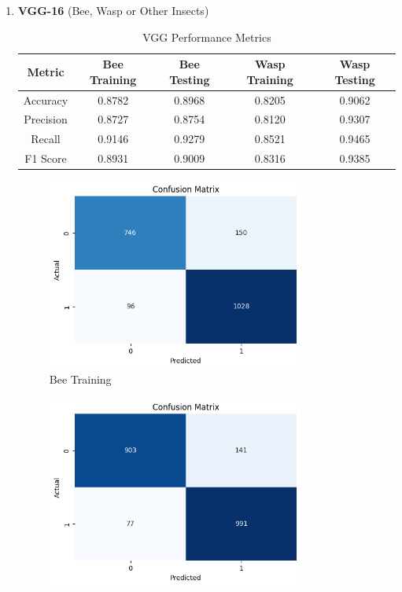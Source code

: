 \documentclass[12pt]{article}
\begin{document}
\begin{enumerate}
		\item \textbf{VGG-16} (Bee, Wasp or Other Insects) \\
		\begin{table}[H]
			\centering
			\caption{VGG Performance Metrics}
			\vspace{0.25 cm}
			\begin{tabular}{|c|c|c|c|c|}
				\hline
				\textbf{Metric} & \textbf{Bee Training} & \textbf{Bee Testing}  & \textbf{Wasp Training} & \textbf{Wasp Testing}\\
				\hline
				Accuracy & 0.8782  & 0.8968 & 0.8205  & 0.9062 \\ \hline
				Precision & 0.8727 & 0.8754  & 0.8120 & 0.9307\\ \hline
				Recall & 0.9146 & 0.9279  & 0.8521 & 0.9465 \\ \hline
				F1 Score & 0.8931 & 0.9009 & 0.8316 & 0.9385 \\ \hline
			\end{tabular}
			\label{tab:VGG_METRICS}
		\end{table}
		\begin{figure}[H]
			\centering
			\begin{minipage}{0.45\textwidth}
				\centering
				\includegraphics[width=0.8\textwidth]{Images/Confusion/vgg bees train.png}\\ \vspace{0.25 cm}
				Bee Training
			\end{minipage}
			\hfill
			\begin{minipage}{0.45\textwidth} 
				\centering           
				\includegraphics[width=0.8\textwidth]{Images/Confusion/vgg bees test.png} \\ \vspace{0.25 cm}

\end{minipage}
\end{figure}
\end{enumerate}
\end{document}
